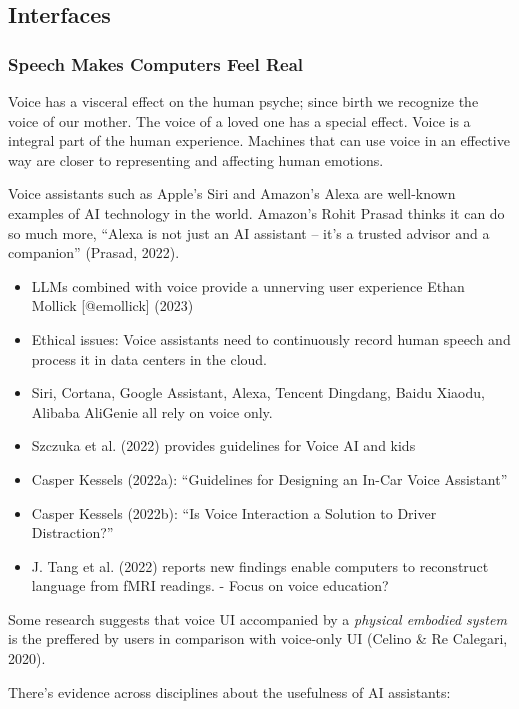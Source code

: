 \documentclass[
  letterpaper,
  DIV=11,
  numbers=noendperiod]{scrartcl}
\providecommand{\tightlist}{%
  \setlength{\itemsep}{0pt}\setlength{\parskip}{0pt}}\usepackage{longtable,booktabs,array}
\begin{document}
\subsection{Interfaces}\label{interfaces}

\subsubsection{Speech Makes Computers Feel
Real}\label{speech-makes-computers-feel-real}

Voice has a visceral effect on the human psyche; since birth we
recognize the voice of our mother. The voice of a loved one has a
special effect. Voice is a integral part of the human experience.
Machines that can use voice in an effective way are closer to
representing and affecting human emotions.

Voice assistants such as Apple's Siri and Amazon's Alexa are well-known
examples of AI technology in the world. Amazon's Rohit Prasad thinks it
can do so much more, ``Alexa is not just an AI assistant -- it's a
trusted advisor and a companion'' (Prasad, 2022).

\begin{itemize}
\tightlist
\item
  LLMs combined with voice provide a unnerving user experience Ethan
  Mollick {[}@emollick{]} (2023)
\item
  Ethical issues: Voice assistants need to continuously record human
  speech and process it in data centers in the cloud.
\item
  Siri, Cortana, Google Assistant, Alexa, Tencent Dingdang, Baidu
  Xiaodu, Alibaba AliGenie all rely on voice only.
\item
  Szczuka et al. (2022) provides guidelines for Voice AI and kids
\item
  Casper Kessels (2022a): ``Guidelines for Designing an In-Car Voice
  Assistant''
\item
  Casper Kessels (2022b): ``Is Voice Interaction a Solution to Driver
  Distraction?''
\item
  J. Tang et al. (2022) reports new findings enable computers to
  reconstruct language from fMRI readings. - Focus on voice education?
\end{itemize}

Some research suggests that voice UI accompanied by a \emph{physical
embodied system} is the preffered by users in comparison with voice-only
UI (Celino \& Re Calegari, 2020).

There's evidence across disciplines about the usefulness of AI
assistants:
\end{document}
